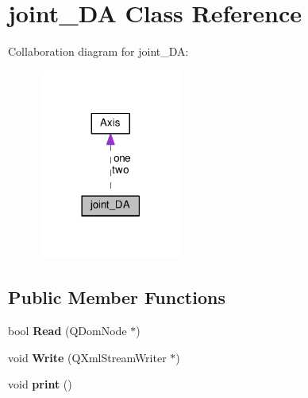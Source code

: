 \section{joint\+\_\+\+DA Class Reference}
\label{classjoint___d_a}


Collaboration diagram for joint\+\_\+\+DA\+:\nopagebreak
\begin{figure}[H]
\begin{center}
\leavevmode
\includegraphics[width=134pt]{classjoint___d_a__coll__graph}
\end{center}
\end{figure}
\subsection*{Public Member Functions}
\begin{DoxyCompactItemize}
\item 
bool {\bfseries Read} (Q\+Dom\+Node $\ast$)\label{classjoint___d_a_a01fa8db350350419630e237554de51d0}

\item 
void {\bfseries Write} (Q\+Xml\+Stream\+Writer $\ast$)\label{classjoint___d_a_ac3e8971fd71fe3013bb41a22b6fb3561}

\item 
void {\bfseries print} ()\label{classjoint___d_a_a4aef35fae9733eeac1e99fda3440935f}

\end{DoxyCompactItemize}
